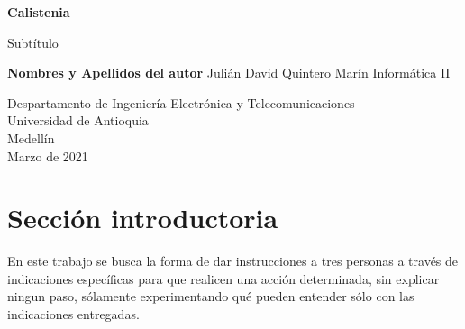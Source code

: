 \documentclass{article}
\begin{document}
\begin{titlepage}
    \begin{center}
        \vspace*{1cm}
            
        \Huge
        \textbf{Calistenia}
            
        \vspace{0.5cm}
        \LARGE
        Subtítulo
            
        \vspace{1.5cm}
            
        \textbf{Nombres y Apellidos del autor}
        \newline Julián David Quintero Marín
        \newline
        \newline
        Informática II
        \vfill
            
        \vspace{0.8cm}
            
        \Large
        Despartamento de Ingeniería Electrónica y Telecomunicaciones\\
        Universidad de Antioquia\\
        Medellín\\
        Marzo de 2021
            
    \end{center}
\end{titlepage}

\tableofcontents
\newpage
\section{Sección introductoria}\label{intro}
En este trabajo se busca la forma de dar instrucciones a tres personas a través de indicaciones específicas para que realicen una acción determinada, sin explicar ningun paso, sólamente experimentando qué pueden entender sólo con las indicaciones entregadas.
\end{document}
